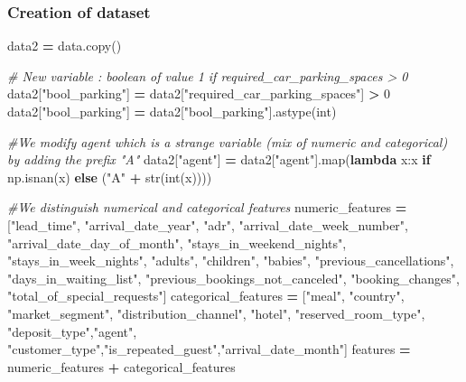 \documentclass[10pt,a4paper]{article}
\newenvironment{Shaded}{\begin{snugshade}}{\end{snugshade}}
\newcommand{\BuiltInTok}[1]{#1}
\newcommand{\CommentTok}[1]{\textcolor[rgb]{0.56,0.35,0.01}{\textit{#1}}}
\newcommand{\ControlFlowTok}[1]{\textcolor[rgb]{0.13,0.29,0.53}{\textbf{#1}}}
\newcommand{\DecValTok}[1]{\textcolor[rgb]{0.00,0.00,0.81}{#1}}
\newcommand{\KeywordTok}[1]{\textcolor[rgb]{0.13,0.29,0.53}{\textbf{#1}}}
\newcommand{\NormalTok}[1]{#1}
\newcommand{\OperatorTok}[1]{\textcolor[rgb]{0.81,0.36,0.00}{\textbf{#1}}}
\newcommand{\StringTok}[1]{\textcolor[rgb]{0.31,0.60,0.02}{#1}}
\theoremstyle{break}
\begin{document}
\hypertarget{creation-of-dataset}{%
\subsubsection{Creation of dataset}\label{creation-of-dataset}}

\begin{Shaded}
\begin{Highlighting}[]
\NormalTok{data2 }\OperatorTok{=}\NormalTok{ data.copy()}

\CommentTok{# New variable : boolean of value 1 if required_car_parking_spaces > 0}
\NormalTok{data2[}\StringTok{"bool_parking"}\NormalTok{] }\OperatorTok{=}\NormalTok{ data2[}\StringTok{"required_car_parking_spaces"}\NormalTok{] }\OperatorTok{>} \DecValTok{0} 
\NormalTok{data2[}\StringTok{"bool_parking"}\NormalTok{] }\OperatorTok{=}\NormalTok{ data2[}\StringTok{"bool_parking"}\NormalTok{].astype(}\BuiltInTok{int}\NormalTok{)}

\CommentTok{#We modify agent which is a strange variable (mix of numeric and categorical) by adding the prefix "A"}
\NormalTok{data2[}\StringTok{"agent"}\NormalTok{] }\OperatorTok{=}\NormalTok{ data2[}\StringTok{"agent"}\NormalTok{].}\BuiltInTok{map}\NormalTok{(}\KeywordTok{lambda}\NormalTok{ x:x }\ControlFlowTok{if}\NormalTok{ np.isnan(x) }\ControlFlowTok{else}\NormalTok{ (}\StringTok{"A"} \OperatorTok{+} \BuiltInTok{str}\NormalTok{(}\BuiltInTok{int}\NormalTok{(x))))}

\CommentTok{#We distinguish numerical and categorical features}
\NormalTok{numeric_features }\OperatorTok{=}\NormalTok{ [}\StringTok{"lead_time"}\NormalTok{, }\StringTok{"arrival_date_year"}\NormalTok{,}
                    \StringTok{"adr"}\NormalTok{,}
                    \StringTok{"arrival_date_week_number"}\NormalTok{,}
                    \StringTok{"arrival_date_day_of_month"}\NormalTok{, }\StringTok{"stays_in_weekend_nights"}\NormalTok{, }\StringTok{"stays_in_week_nights"}\NormalTok{, }
                    \StringTok{"adults"}\NormalTok{, }\StringTok{"children"}\NormalTok{,}
                    \StringTok{"babies"}\NormalTok{, }\StringTok{"previous_cancellations"}\NormalTok{, }
                    \StringTok{"days_in_waiting_list"}\NormalTok{, }\StringTok{"previous_bookings_not_canceled"}\NormalTok{, }\StringTok{"booking_changes"}\NormalTok{, }
                    \StringTok{"total_of_special_requests"}\NormalTok{]}
\NormalTok{categorical_features }\OperatorTok{=}\NormalTok{ [}\StringTok{"meal"}\NormalTok{, }\StringTok{"country"}\NormalTok{, }\StringTok{"market_segment"}\NormalTok{, }\StringTok{"distribution_channel"}\NormalTok{,}
                        \StringTok{"hotel"}\NormalTok{, }\StringTok{"reserved_room_type"}\NormalTok{, }\StringTok{"deposit_type"}\NormalTok{,}\StringTok{"agent"}\NormalTok{, }
                       \StringTok{"customer_type"}\NormalTok{,}\StringTok{"is_repeated_guest"}\NormalTok{,}\StringTok{"arrival_date_month"}\NormalTok{]                        }
\NormalTok{features }\OperatorTok{=}\NormalTok{ numeric_features }\OperatorTok{+}\NormalTok{ categorical_features}
\end{Highlighting}
\end{Shaded}
\end{document}
